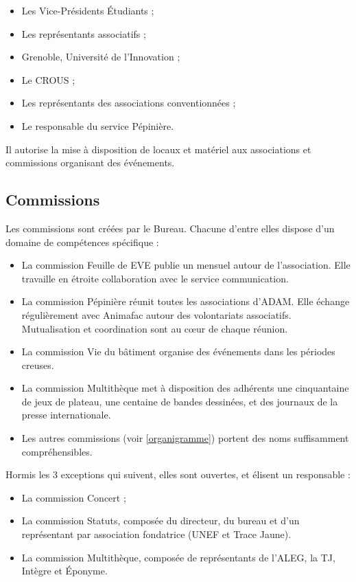 \begin{itemize}
\item Les Vice-Présidents Étudiants ;
\item Les représentants associatifs ;
\item Grenoble, Université de l'Innovation ;
\item Le CROUS ;
\item Les représentants des associations conventionnées ;
\item Le responsable du service Pépinière.
\end{itemize}

Il autorise la mise à disposition de locaux et matériel aux associations
et commissions organisant des événements.

\subsection{Commissions}

Les commissions sont créées par le Bureau.
Chacune d'entre elles dispose d'un domaine de compétences spécifique :

\begin{itemize}
\item La commission Feuille de EVE publie un mensuel autour de l'association. Elle travaille
      en étroite collaboration avec le service communication.
\item La commission Pépinière réunit toutes les associations d'ADAM. Elle échange
      régulièrement avec Animafac autour des volontariats associatifs. Mutualisation
      et coordination sont au cœur de chaque réunion.
\item La commission Vie du bâtiment organise des événements dans les périodes creuses.
\item La commission Multithèque met à disposition des adhérents une cinquantaine
      de jeux de plateau, une centaine de bandes dessinées,
      et des journaux de la presse internationale.
\item Les autres commissions (voir \ref{organigramme}) portent des noms suffisamment compréhensibles.
\end{itemize}

Hormis les 3 exceptions qui suivent, elles sont ouvertes,
et élisent un responsable :

\begin{itemize}
\item La commission Concert ;
\item La commission Statuts, composée du directeur, du bureau et d'un représentant par
       association fondatrice (UNEF et Trace Jaune).
\item La commission Multithèque, composée de représentants de l'ALEG, la TJ, Intègre et Éponyme.
\end{itemize}


